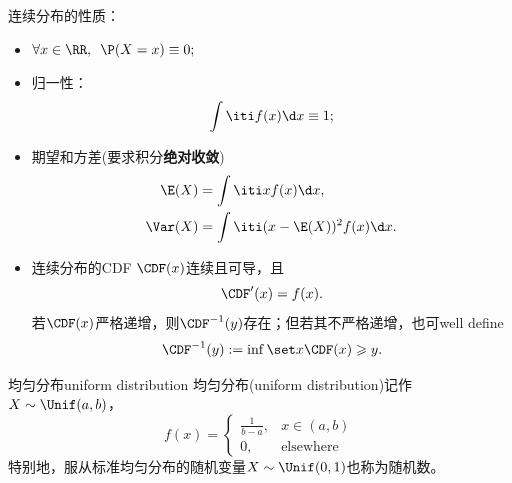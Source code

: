 \begin{corollary}
	连续分布的性质：
	\begin{itemize}
		\item $\forall x\in\RR,\enspace\P(X=x)\equiv 0;$
		\item 归一性：
			\begin{equation}
				\int\iti f(x)\d x\equiv 1;
			\end{equation}
		\item 期望和方差(要求积分\textbf{绝对收敛})
			\begin{subequations}
				\begin{align}
					\E(X)&=\int\iti xf(x)\d x,\\
					\Var(X)&=\int\iti(x-\E(X))^2f(x)\d x.
				\end{align}
			\end{subequations}
		\item 连续分布的CDF $\CDF(x)$连续且可导，且
			\begin{equation}
				\CDF'(x)=f(x).
			\end{equation}
			若$\CDF(x)$严格递增，则$\CDF^{-1}(y)$存在；但若其不严格递增，也可well define
			\begin{equation}
				\label{eqn:CDF-1}
				\CDF^{-1}(y):=\inf\set x{\CDF(x)\geqslant y}.
			\end{equation}
	\end{itemize}
\end{corollary}

\begin{definition}{均匀分布}{uniform distribution}
	均匀分布(uniform distribution)记作$X\sim\Unif(a,b)$，%
	\begin{equation}
		f(x)=\begin{cases}
			\frac1{b-a},&x\in(a,b)\\
			0,&\text{elsewhere}
		\end{cases}
	\end{equation}
	特别地，服从标准均匀分布的随机变量$X\sim\Unif(0,1)$也称为随机数。
\end{definition}
